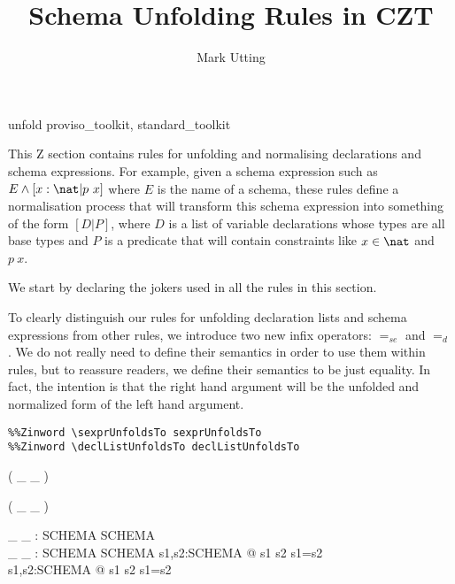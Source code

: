 \documentclass{article}
\title{Schema Unfolding Rules in CZT}
\author{Mark Utting}
\newcommand{\sexprUnfoldsTo}{\mathrel{=_{se}}}
\newcommand{\declListUnfoldsTo}{\mathrel{=_d}}
\begin{document}
\maketitle

\begin{zsection}
  \SECTION unfold \parents proviso\_toolkit, standard\_toolkit
\end{zsection}

This Z section contains rules for unfolding and normalising declarations
and schema expressions.  For example, given a schema expression such as 
$E \land [x:\nat | p~x]$ where $E$ is the name of a schema, these rules
define a normalisation process that will transform this schema expression
into something of the form $[D|P]$, where $D$ is a list of variable
declarations whose types are all base types and $P$ is a predicate that
will contain constraints like $x \in \nat$ and $p~x$.

We start by declaring the jokers used in all the rules in this section.

To clearly distinguish our rules for unfolding declaration lists and
schema expressions from other rules, we introduce two new infix
operators: $\sexprUnfoldsTo$ and $\declListUnfoldsTo$.  
We do not really need to define their semantics in order to use them within
rules, but to reassure readers, we define their semantics to be just
equality.  In fact, the intention is that the right hand argument
will be the unfolded and normalized form of the left hand argument.

\begin{verbatim}
%%Zinword \sexprUnfoldsTo sexprUnfoldsTo
%%Zinword \declListUnfoldsTo declListUnfoldsTo
\end{verbatim}

\begin{zed}
  \relation ( \_ \sexprUnfoldsTo \_ )
\end{zed}
\begin{zed}
  \relation ( \_ \declListUnfoldsTo \_ )
\end{zed}


\begin{gendef}[SCHEMA]
  \_ \sexprUnfoldsTo \_ : SCHEMA \rel SCHEMA \\
  \_ \declListUnfoldsTo \_ : SCHEMA \rel SCHEMA
\where
  \forall s1,s2:SCHEMA @ s1 \sexprUnfoldsTo s2 \iff s1=s2 \\
  \forall s1,s2:SCHEMA @ s1 \declListUnfoldsTo s2 \iff s1=s2 \\
\end{gendef}
\end{document}
